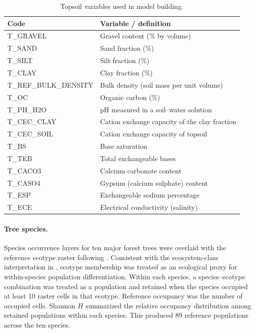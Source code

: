 \documentclass[11pt]{article}
\begin{document}
\begin{table}[htbp]
  \centering
  \caption{Topsoil variables used in model building.}
  \label{tab:topsoil-vars}
  \small
  \setlength{\tabcolsep}{5pt}
  \renewcommand{\arraystretch}{1.08}
  \begin{tabularx}{\textwidth}{@{}>{\raggedright\arraybackslash}p{} >{\raggedright\arraybackslash}X@{}}
    \toprule
    Code & Variable / definition \\
    \midrule
    T\_GRAVEL & Gravel content (\% by volume) \\
    T\_SAND & Sand fraction (\%) \\
    T\_SILT & Silt fraction (\%) \\
    T\_CLAY & Clay fraction (\%) \\
    T\_REF\_BULK\_DENSITY & Bulk density (soil mass per unit volume) \\
    T\_OC & Organic carbon (\%) \\
    T\_PH\_H2O & pH measured in a soil--water solution \\
    T\_CEC\_CLAY & Cation exchange capacity of the clay fraction \\
    T\_CEC\_SOIL & Cation exchange capacity of topsoil \\
    T\_BS & Base saturation \\
    T\_TEB & Total exchangeable bases \\
    T\_CACO3 & Calcium carbonate content \\
    T\_CASO4 & Gypsum (calcium sulphate) content \\
    T\_ESP & Exchangeable sodium percentage \\
    T\_ECE & Electrical conductivity (salinity) \\
    \bottomrule
  \end{tabularx}
\end{table}

\paragraph{Tree species.}
Species occurrence layers for ten major forest trees were overlaid with the reference ecotype raster following \citet{wang2020}. Consistent with the ecosystem-class interpretation in \citet{wangCampbell2026}, ecotype membership was treated as an ecological proxy for within-species population differentiation. Within each species, a species--ecotype combination was treated as a population and retained when the species occupied at least 10 raster cells in that ecotype. Reference occupancy was the number of occupied cells. Shannon $H$ summarized the relative occupancy distribution among retained populations within each species. This produced 89 reference populations across the ten species.
\end{document}
